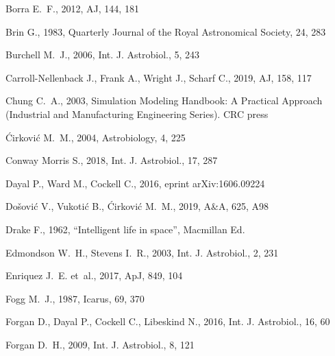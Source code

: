 \documentclass[crop]{CSLB}
\begin{document}
\begin{thebibliography}{95}
Borra E.~F., 2012, AJ, 144, 181

Brin G., 1983, Quarterly Journal of the Royal Astronomical Society, 24, 283

Burchell M.~J., 2006, Int. J. Astrobiol., 5, 243

Carroll-Nellenback J., Frank A., Wright J., Scharf C., 2019, AJ, 158, 117

Chung C.~A., 2003, {Simulation Modeling Handbook: A Practical Approach
  (Industrial and Manufacturing Engineering Series)}. CRC press

{\'{C}}irkovi{\'{c}} M.~M., 2004, Astrobiology, 4, 225

{Conway Morris} S., 2018, Int. J. Astrobiol., 17, 287

Dayal P., Ward M., Cockell C., 2016, eprint arXiv:1606.09224

Do{\v{s}}ovi{\'{c}} V., Vukoti{\'{c}} B., {\'{C}}irkovi{\'{c}} M.~M., 2019,
  A\&A, 625, A98

Drake F., 1962, ``Intelligent life in space'', Macmillan Ed.

Edmondson W.~H., Stevens I.~R., 2003, Int. J. Astrobiol., 2,
  231

Enriquez J.~E. {et~al.}, 2017, ApJ, 849, 104

Fogg M.~J., 1987, Icarus, 69, 370

Forgan D., Dayal P., Cockell C., Libeskind N., 2016, Int. J. Astrobiol., 16, 60

Forgan D.~H., 2009, Int. J. Astrobiol., 8, 121


\end{thebibliography}
\end{document}
